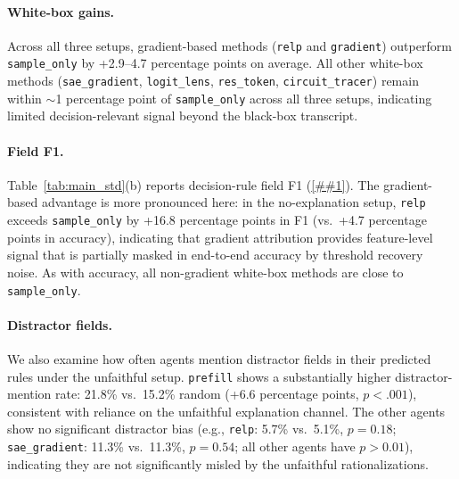 \documentclass{article} %
\newcommand{\Cref}[1]{\ref{##1}}
\begin{document}
\vspace{-0.15in}
\paragraph{White-box gains.}
Across all three setups, gradient-based methods (\texttt{relp} and \texttt{gradient}) outperform \texttt{sample\_only} by {+2.9--4.7} percentage points on average.
All other white-box methods (\texttt{sae\_gradient}, \texttt{logit\_lens}, \texttt{res\_token}, \texttt{circuit\_tracer}) remain within ${\sim}$1 percentage point of \texttt{sample\_only} across all three setups, indicating limited decision-relevant signal beyond the black-box transcript.

\vspace{-0.15in}
\paragraph{Field F1.}
Table~\ref{tab:main_std}(b) reports decision-rule field F1 (\Cref{sec:eval}).
The gradient-based advantage is more pronounced here: in the no-explanation setup, \texttt{relp} exceeds \texttt{sample\_only} by {+16.8} percentage points in F1 (vs.\ {+4.7} percentage points in accuracy), indicating that gradient attribution provides feature-level signal that is partially masked in end-to-end accuracy by threshold recovery noise.
As with accuracy, all non-gradient white-box methods are close to \texttt{sample\_only}.

\vspace{-0.15in}
\paragraph{Distractor fields.}
We also examine how often agents mention distractor fields in their predicted rules under the unfaithful setup.
\texttt{prefill} shows a substantially higher distractor-mention rate: 21.8\% vs.\ 15.2\% random (+6.6 percentage points, $p < .001$), consistent with reliance on the unfaithful explanation channel.
The other agents show no significant distractor bias (e.g., \texttt{relp}: 5.7\% vs.\ 5.1\%, $p = 0.18$; \texttt{sae\_gradient}: 11.3\% vs.\ 11.3\%, $p = 0.54$; all other agents have $p>0.01$), indicating they are not significantly misled by the unfaithful rationalizations.


\end{document}
